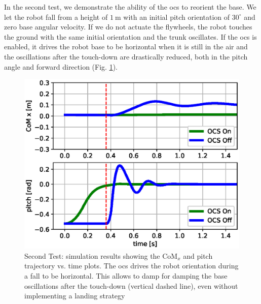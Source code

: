 \documentclass[letterpaper, 10 pt, conference]{ieeeconf}      %
\begin{document}
In the second test, we demonstrate the ability of the \gls{ocs} to reorient the base.
We let the robot fall from a height of $1 \ \mathrm{m}$ with an initial pitch orientation of $30^\circ$ and zero base angular velocity.
If we do not actuate the flywheels, the robot touches the ground with the same initial orientation and the trunk oscillates. If the \gls{ocs} is enabled, it drives the robot base to be horizontal when it is still in the air and the oscillations after the touch-down are drastically reduced, both in the pitch angle and forward direction (Fig. \ref{fig:fall_plot}).
\begin{figure}
	\centering
	\includegraphics[width=1\linewidth]{figures/fall_plot.eps}
	\caption{\small Second Test: simulation results showing the $\mathrm{CoM}_x$ and pitch trajectory vs. time plots. The \gls{ocs} drives the robot orientation during a fall to be horizontal. This allows to damp for damping the base oscillations after the touch-down (vertical dashed line), even without implementing a landing strategy}
	\label{fig:fall_plot}
\end{figure}


\end{document}
